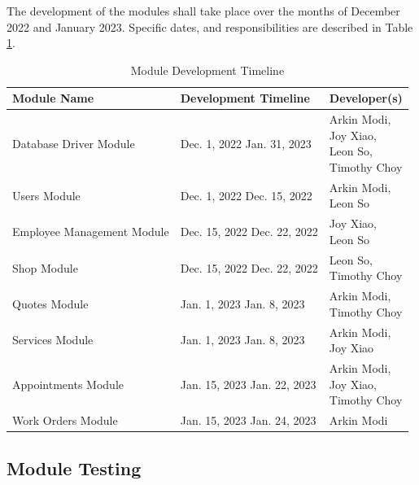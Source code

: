 \documentclass[12pt, titlepage]{article}
\begin{document}
The development of the modules shall take place over the months of December 2022 and January 2023.
Specific dates, and responsibilities are described in Table \ref{ModuleDevelopmentTimeline}.

\begin{table}[H]
	\caption{Module Development Timeline} \label{ModuleDevelopmentTimeline}
	\begin{tabular}{|p{}|p{}|p{}|}
		\hline
		\textbf{Module Name}       & \textbf{Development Timeline}             & \textbf{Developer(s)}    \\
		\hline
		Database Driver Module     & Dec. 1, 2022 \textemdash{} Jan. 31, 2023  & \makecell[l]{Arkin Modi, \\Joy Xiao,\\Leon So,\\Timothy Choy} \\
		\hline
		Users Module               & Dec. 1, 2022 \textemdash{} Dec. 15, 2022  & \makecell[l]{Arkin Modi, \\Leon So} \\
		\hline
		Employee Management Module & Dec. 15, 2022 \textemdash{} Dec. 22, 2022 & \makecell[l]{Joy Xiao,   \\Leon So} \\
		\hline
		Shop Module                & Dec. 15, 2022 \textemdash{} Dec. 22, 2022 & \makecell[l]{Leon So,    \\Timothy Choy} \\
		\hline
		Quotes Module              & Jan. 1, 2023 \textemdash{} Jan. 8, 2023   & \makecell[l]{Arkin Modi, \\Timothy Choy} \\
		\hline
		Services Module            & Jan. 1, 2023 \textemdash{} Jan. 8, 2023   & \makecell[l]{Arkin Modi, \\Joy Xiao} \\
		\hline
		Appointments Module        & Jan. 15, 2023 \textemdash{} Jan. 22, 2023 & \makecell[l]{Arkin Modi, \\Joy Xiao,\\Timothy Choy} \\
		\hline
		Work Orders Module         & Jan. 15, 2023 \textemdash{} Jan. 24, 2023 & Arkin Modi               \\
		\hline
	\end{tabular}
\end{table}

\subsection{Module Testing}
\end{document}
